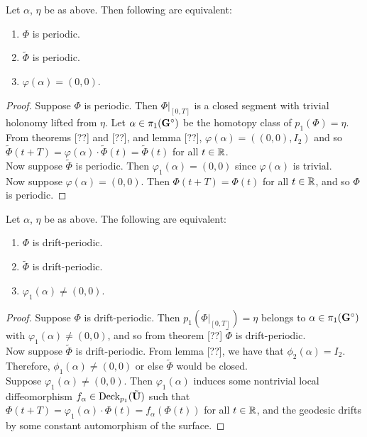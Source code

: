 \documentclass[a4paper, 11pt]{article}
\def\phitild{\tilde{\Phi}}
\begin{document}
\begin{cor}
Let $\alpha$, $\eta$ be as above. Then following are equivalent:
\begin{enumerate}
\item $\Phi$ is periodic.
\item $\phitild$ is periodic.
\item $\varphi(\alpha)=(0,0)$.
\end{enumerate}
\begin{proof}
Suppose $\Phi$ is periodic. Then $\Phi\vert_{[0,T]}$ is a closed segment with trivial holonomy lifted from $\eta$. Let $\alpha\in\pi_1(\mathbf{G}^\circ)$ be the homotopy class of $p_1(\Phi)=\eta$. From theorems [??] and [??], and lemma [??], $\varphi(\alpha)=((0,0),I_2)$ and so $\phitild(t+T)=\varphi(\alpha)\cdot\phitild(t)=\phitild(t)$ for all $t\in\mathbb{R}$.\\
Now suppose $\phitild$ is periodic. Then $\varphi_1(\alpha)=(0,0)$ since $\varphi(\alpha)$ is trivial.\\ Now suppose $\varphi(\alpha)=(0,0)$. Then $\Phi(t+T)=\Phi(t)$ for all $t\in\mathbb{R}$, and so $\Phi$ is periodic.
\end{proof}
\end{cor}

\begin{cor}
Let $\alpha$, $\eta$ be as above. The following are equivalent:
\begin{enumerate}
\item $\Phi$ is drift-periodic.
\item $\phitild$ is drift-periodic.
\item $\varphi_1(\alpha)\neq(0,0)$.
\end{enumerate}
\begin{proof}
Suppose $\Phi$ is drift-periodic. Then $p_1(\Phi\vert_{[0,T]})=\eta$ belongs to $\alpha\in\pi_1(\mathbf{G}^\circ)$ with $\varphi_1(\alpha)\neq (0,0)$, and so from theorem [??] $\phitild$ is drift-periodic.\\ 
Now suppose $\phitild$ is drift-periodic. From lemma [??], we have that $\phi_2(\alpha)=I_2$. Therefore, $\phi_1(\alpha)\neq (0,0)$ or else $\phitild$ would be closed.\\
Suppose $\varphi_1(\alpha)\neq (0,0)$. Then $\varphi_1(\alpha)$ induces some nontrivial local diffeomorphism $f_\alpha\in\text{Deck}_{p_1}(\tilde{\mathbf{U}})$ such that $\Phi(t+T)=\varphi_1(\alpha)\cdot\Phi(t)=f_\alpha(\Phi(t))$ for all $t\in\mathbb{R}$, and the geodesic drifts by some constant automorphism of the surface.
\end{proof}
\end{cor}
\end{document}
